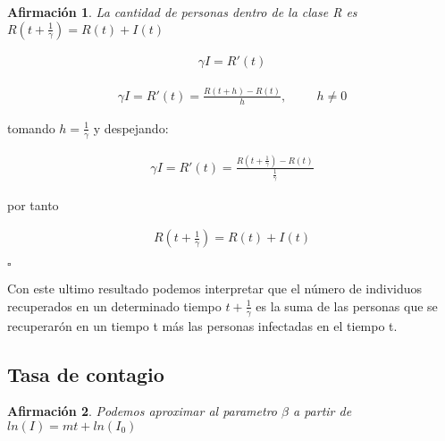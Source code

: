 \documentclass[a4paper,openany,12pt]{book}
\newtheorem{Af}{Afirmación}
\begin{document}
\begin{Af}
La cantidad de personas dentro de la clase R es $R(t+\frac{1}{\gamma}) = R(t) + I(t)$
\end{Af}

\begin{Dem}
\begin{align*}
\gamma I = R'(t)
\end{align*}

\begin{align*}
\gamma I = R'(t) = \frac{R\left( t + h \right) - R\left(t\right)}{h}, \hspace{1cm} h \neq 0
\end{align*}

tomando $h = \frac{1}{\gamma}$ y despejando: 

\begin{align*}
\gamma I = R'(t) = \frac{R\left( t + \frac{1}{\gamma} \right) - R\left(t\right)}{\frac{1}{\gamma}}
\end{align*}

por tanto

\begin{align*}
R\left( t + \frac{1}{\gamma} \right) = R(t) + I(t)
\end{align*}

\hfill	$\square$
\end{Dem}

Con este ultimo resultado podemos interpretar que el número de individuos recuperados en un determinado tiempo $t + \frac {1}{\gamma}$  es la suma de las personas que se recuperarón en un tiempo t más las personas infectadas en el tiempo t.

\subsection{\textbf{Tasa de contagio}}

\begin{Af}
Podemos aproximar al parametro $\beta$ a partir de $ln(I) = mt + ln(I_{0})$ \cite{Algeria}
\end{Af}
\end{document}
